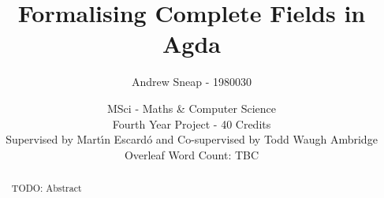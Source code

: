 \documentclass{article}
\title{Formalising Complete Fields in Agda}
\author{Andrew Sneap - 1980030}
\date{MSci - Maths \& Computer Science \\ Fourth Year Project - 40 Credits \\ Supervised by Mart{\'\i}n Escard\'o and Co-supervised by Todd Waugh Ambridge \\ Overleaf Word Count: TBC}
\begin{document}
\maketitle

\AgdaNoSpaceAroundCode

\begin{abstract}
    TODO: Abstract
\end{abstract}

\tableofcontents








\newpage
\printbibliography
\end{document}
